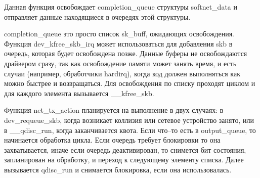 Данная функция освобождает completion\_queue структуры softnet\_data и отправляет данные находящиеся в очередях этой структуры. 

completion\_queue это просто список sk\_buff, ожидающих освобождения. Функция dev\_kfree\_skb\_irq может использоваться для добавления skb в очередь, которая будет освобождена позже. Данные буферы не освобождаются драйвером сразу, так как освобождение памяти может занять время, и есть случаи (например, обработчики hardirq), когда код должен выполняться как можно быстрее и возвращаться. Для освобождения по списку проходят циклом и для каждого элемента вызывается \_\_kfree\_skb.

Функция net\_tx\_action планируется на выполнение в двух случаях: в dev\_requeue\_skb, когда возникает коллизия или сетевое устройство занято, или в \_\_qdisc\_run, когда заканчивается квота. Если что--то есть в output\_queue, то начинается обработка цикла. Если очередь требует блокировки то она захватывается, иначе если очередь деактивирован, то снимется бит состояния, запланирован на обработку, и переход к следующему элементу списка. Далее вызывается  qdisc\_run и снимается блокировка, если она использовалась.